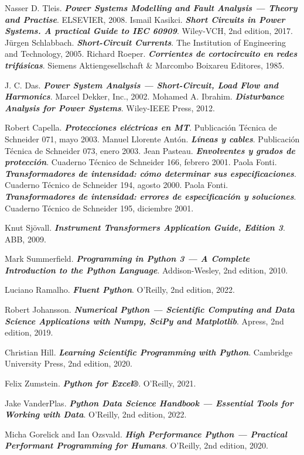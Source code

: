 \begin{thebibliography}{99}
     Nasser D. Tleis. \textbf{\textit{Power Systems Modelling and Fault Analysis --- Theory and Practise}}.  ELSEVIER, 2008.
     Ismail Kasikci. \textbf{\textit{Short Circuits in Power Systems. A practical Guide to IEC 60909}}.  Wiley-VCH, 2nd edition, 2017.
     Jürgen Schlabbach. \textbf{\textit{Short-Circuit Currents}}.  The Institution of Engineering and Technology, 2005.
     Richard Roeper. \textbf{\textit{Corrientes de cortocircuito en redes trifásicas}}.  Siemens Aktiengesellschaft \& Marcombo Boixareu Editores, 1985.

     J. C. Das. \textbf{\textit{Power System Analysis --- Short-Circuit, Load Flow and Harmonics}}. Marcel Dekker, Inc., 2002.
     Mohamed A. Ibrahim. \textbf{\textit{Disturbance Analysis for Power Systems}}. Wiley-IEEE Press, 2012.

     Robert Capella. \textbf{\textit{Protecciones eléctricas en MT}}.  Publicación Técnica de Schneider 071, mayo 2003.
     Manuel Llorente Antón. \textbf{\textit{Líneas y cables}}.  Publicación Técnica de Schneider 073, enero 2003.
     Jean Pasteau. \textbf{\textit{Envolventes y grados de protección}}.  Cuaderno Técnico de Schneider 166, febrero 2001.
     Paola Fonti. \textbf{\textit{Transformadores de intensidad: cómo determinar sus especificaciones}}.  Cuaderno Técnico de Schneider 194, agosto 2000.
     Paola Fonti. \textbf{\textit{Transformadores de intensidad: errores de especificación y soluciones}}.  Cuaderno Técnico de Schneider 195, diciembre 2001.

     Knut Sjövall. \textbf{\textit{Instrument Transformers Application Guide, Edition 3}}.  ABB, 2009.
    
     Mark Summerfield. \textbf{\textit{Programming in Python 3 --- A Complete Introduction to the Python Language}}.  Addison-Wesley, 2nd edition, 2010.
    
     Luciano Ramalho. \textbf{\textit{Fluent Python}}.  O'Reilly, 2nd edition, 2022.
    	
     Robert Johansson. \textbf{\textit{Numerical
    		Python --- Scientific Computing and Data Science Applications with Numpy,
    		SciPy and Matplotlib}}.  Apress, 2nd edition, 2019.
    
     Christian Hill. \textbf{\textit{Learning Scientific Programming with Python}}.  Cambridge University Press, 2nd edition,  2020.
    
      Felix Zumstein. \textbf{\textit{Python for Excel®}}.  O'Reilly, 2021.
        
      Jake VanderPlas. \textbf{\textit{Python Data Science Handbook --- Essential Tools for Working with Data}}.  O'Reilly, 2nd edition, 2022.
     
      Micha Gorelick and Ian Ozsvald. \textbf{\textit{High Performance Python --- Practical Performant Programming for Humans}}.  O'Reilly, 2nd edition, 2020.

\end{thebibliography}
